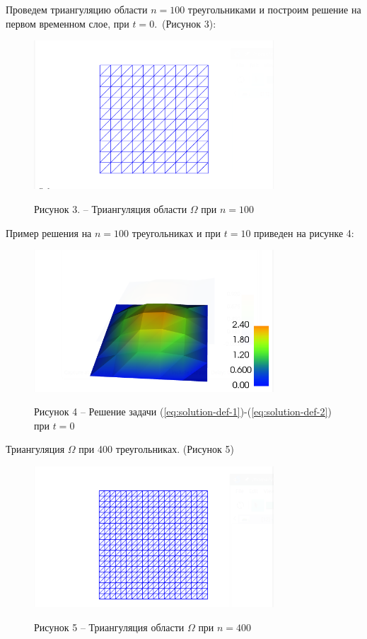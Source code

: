 Проведем триангуляцию области $n=100$ треугольниками и построим решение на первом временном слое, при $t=0$.~(Рисунок 3):
\begin{figure}[H]
      \centering
      \includegraphics[width=0.8\textwidth]{plots/n10t10_polygons.png}\\
      \centering\caption*{Рисунок 3. -- Триангуляция области $\Omega$ при $n=100$}
\end{figure}

Пример решения на $n=100$ треугольниках и при $t=10$ приведен на рисунке 4:
\begin{figure}[H]
      \centering
      \includegraphics[width=0.8\textwidth]{plots/n10t10.png}\\
      \centering\caption*{Рисунок 4 -- Решение задачи (\ref{eq:solution-def-1})-(\ref{eq:solution-def-2}) при $t=0$}
\end{figure}

Триангуляция $\Omega$ при 400 треугольниках. (Рисунок 5)
\begin{figure}[H]
      \centering
      \includegraphics[width=0.8\textwidth]{plots/n20t0_polygons.png}\\
      \centering\caption*{Рисунок 5 -- Триангуляция области $\Omega$ при $n=400$}
\end{figure}

